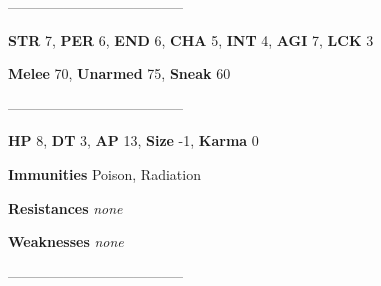 \documentclass[11pt,a4paper,twocolumn]{book}
\begin{document}
	--------------------------------------

	\noindent
	\textbf{STR} 7, \textbf{PER} 6, \textbf{END} 6, \textbf{CHA} 5, \textbf{INT} 4, \textbf{AGI} 7, \textbf{LCK} 3
	
	\noindent
	\textbf{Melee} 70, \textbf{Unarmed} 75, \textbf{Sneak} 60
	
	--------------------------------------
	
	\noindent
	\textbf{HP} 8, \textbf{DT} 3, \textbf{AP} 13, \textbf{Size} -1, \textbf{Karma} 0
	
	
	\noindent
	\textbf{Immunities} Poison, Radiation%
	
	\noindent
	\textbf{Resistances} \emph{none} %
	
	\noindent
	\textbf{Weaknesses} \emph{none} %
	
	--------------------------------------
	
	
\end{document}
